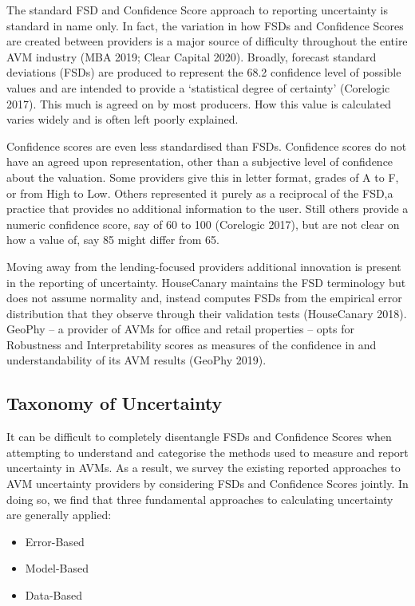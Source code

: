 \documentclass[colTwo]{format}
\theoremstyle{definition}
\begin{document}
The standard FSD and Confidence Score approach to reporting uncertainty is standard in name only. In fact, the variation in how FSDs and Confidence Scores are created between providers is a major source of difficulty throughout the entire AVM industry (MBA 2019; Clear Capital 2020).     Broadly, forecast standard deviations (FSDs) are produced to represent the 68.2 confidence level of possible values and are intended to provide a ‘statistical degree of certainty’ (Corelogic 2017).  This much is agreed on by most producers.  How this value is calculated varies widely and is often left poorly explained.  

Confidence scores are even less standardised than FSDs.  Confidence scores do not have an agreed upon representation, other than a subjective level of confidence about the valuation.  Some providers give this in letter format, grades of A to F, or from High to Low.  Others represented it purely as a reciprocal of the FSD,a practice that provides no additional information to the user.  Still others provide a numeric confidence score, say of 60 to 100 (Corelogic 2017), but are not clear on how a value of, say 85 might differ from 65.  

Moving away from the lending-focused providers additional innovation is present in the reporting of uncertainty.  HouseCanary maintains the FSD terminology but does not assume normality and, instead computes FSDs from the empirical error distribution that they observe through their validation tests (HouseCanary 2018).  GeoPhy -- a provider of AVMs for office and retail properties -- opts for Robustness and Interpretability scores as measures of the confidence in and understandability of its AVM results (GeoPhy 2019).  

\subsection{Taxonomy of Uncertainty}

It can be difficult to completely disentangle FSDs and Confidence Scores when attempting to understand and categorise the methods used to measure and report uncertainty in AVMs.  As a result, we survey the existing reported approaches to AVM uncertainty providers by 
considering FSDs and Confidence Scores jointly.  In doing so, we find that three fundamental approaches to calculating uncertainty are generally applied: 

\begin{itemize}
\item Error-Based
\item Model-Based
\item Data-Based
\end{itemize}
\end{document}
